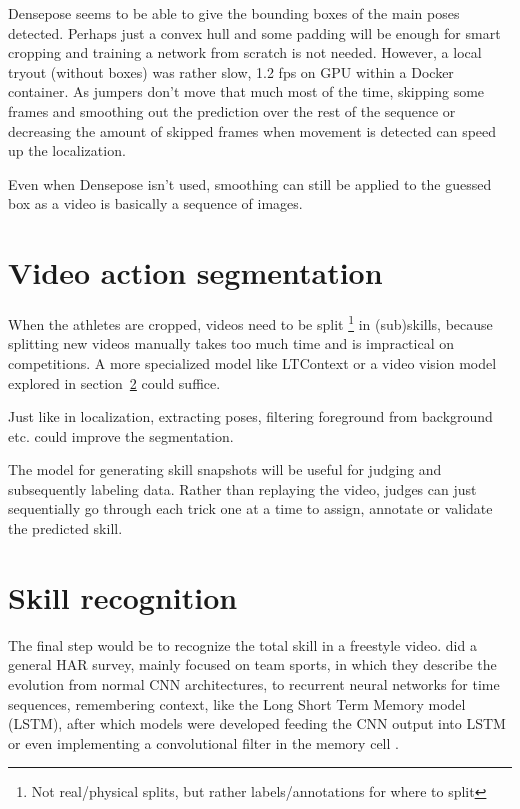 Densepose seems to be able to give the bounding boxes of the main poses detected. Perhaps just a convex hull and some padding will be enough for smart cropping and training a network from scratch is not needed.
However, a local tryout (without boxes) was rather slow, 1.2 fps on GPU within a Docker container.
As jumpers don't move that much most of the time, skipping some frames and smoothing out the prediction over the rest of the sequence or decreasing the amount of skipped frames when movement is detected can speed up the localization.

Even when Densepose isn't used, smoothing can still be applied to the guessed box as a video is basically a sequence of images.




\section{Video action segmentation}

When the athletes are cropped, videos need to be split \footnote{Not real/physical splits, but rather labels/annotations for where to split} in (sub)skills, because splitting new videos manually takes too much time and is impractical on competitions. A more specialized model like LTContext \autocite{Jiaming_2023} or a video vision model explored in section~\ref{subsec:bp-skill-recognition} could suffice.

Just like in localization, extracting poses, filtering foreground from background etc. could improve the segmentation.

The model for generating skill snapshots will
be useful for judging and subsequently labeling
data. Rather than replaying the video, judges can
just sequentially go through each trick one at a
time to assign, annotate or validate the predicted
skill.




\section{Skill recognition}
\label{subsec:bp-skill-recognition}

The final step would be to recognize the total skill in a freestyle video.
\textcite{Yin_2024} did a general HAR survey, mainly focused on team sports, in which they describe the evolution from normal CNN architectures, to recurrent neural networks for time sequences, remembering context, like the Long Short Term Memory model (LSTM), after which models were developed feeding the CNN output into LSTM or even implementing a convolutional filter in the memory cell \autocite{Shi_2015}.

